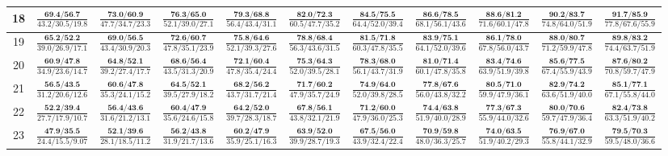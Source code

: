 \documentclass{slides}
\begin{document}
{{{\begin{tabular}{|c|c|c|c|c|c|c|c|c|c|c|}
\hline
18 & $\frac{\textbf{69.4/56.7}}{43.2/30.5/19.8}$ & $\frac{\textbf{73.0/60.9}}{47.7/34.7/23.3}$ & $\frac{\textbf{76.3/65.0}}{52.1/39.0/27.1}$ & $\frac{\textbf{79.3/68.8}}{56.4/43.4/31.1}$ & $\frac{\textbf{82.0/72.3}}{60.5/47.7/35.2}$ & $\frac{\textbf{84.5/75.5}}{64.4/52.0/39.4}$ & $\frac{\textbf{86.6/78.5}}{68.1/56.1/43.6}$ & $\frac{\textbf{88.6/81.2}}{71.6/60.1/47.8}$ & $\frac{\textbf{90.2/83.7}}{74.8/64.0/51.9}$ & $\frac{\textbf{91.7/85.9}}{77.8/67.6/55.9}$ \\
\hline
19 & $\frac{\textbf{65.2/52.2}}{39.0/26.9/17.1}$ & $\frac{\textbf{69.0/56.5}}{43.4/30.9/20.3}$ & $\frac{\textbf{72.6/60.7}}{47.8/35.1/23.9}$ & $\frac{\textbf{75.8/64.6}}{52.1/39.3/27.6}$ & $\frac{\textbf{78.8/68.4}}{56.3/43.6/31.5}$ & $\frac{\textbf{81.5/71.8}}{60.3/47.8/35.5}$ & $\frac{\textbf{83.9/75.1}}{64.1/52.0/39.6}$ & $\frac{\textbf{86.1/78.0}}{67.8/56.0/43.7}$ & $\frac{\textbf{88.0/80.7}}{71.2/59.9/47.8}$ & $\frac{\textbf{89.8/83.2}}{74.4/63.7/51.9}$ \\
\hline
20 & $\frac{\textbf{60.9/47.8}}{34.9/23.6/14.7}$ & $\frac{\textbf{64.8/52.1}}{39.2/27.4/17.7}$ & $\frac{\textbf{68.6/56.4}}{43.5/31.3/20.9}$ & $\frac{\textbf{72.1/60.4}}{47.8/35.4/24.4}$ & $\frac{\textbf{75.3/64.3}}{52.0/39.5/28.1}$ & $\frac{\textbf{78.3/68.0}}{56.1/43.7/31.9}$ & $\frac{\textbf{81.0/71.4}}{60.1/47.8/35.8}$ & $\frac{\textbf{83.4/74.6}}{63.9/51.9/39.8}$ & $\frac{\textbf{85.6/77.5}}{67.4/55.9/43.9}$ & $\frac{\textbf{87.6/80.2}}{70.8/59.7/47.9}$ \\
\hline
21 & $\frac{\textbf{56.5/43.5}}{31.2/20.6/12.6}$ & $\frac{\textbf{60.6/47.8}}{35.3/24.1/15.2}$ & $\frac{\textbf{64.5/52.1}}{39.5/27.9/18.2}$ & $\frac{\textbf{68.2/56.2}}{43.7/31.7/21.4}$ & $\frac{\textbf{71.7/60.2}}{47.9/35.7/24.9}$ & $\frac{\textbf{74.9/64.0}}{52.0/39.8/28.5}$ & $\frac{\textbf{77.8/67.6}}{56.0/43.8/32.2}$ & $\frac{\textbf{80.5/71.0}}{59.9/47.9/36.1}$ & $\frac{\textbf{82.9/74.2}}{63.6/51.9/40.0}$ & $\frac{\textbf{85.1/77.1}}{67.1/55.8/44.0}$ \\
\hline
22 & $\frac{\textbf{52.2/39.4}}{27.7/17.9/10.7}$ & $\frac{\textbf{56.4/43.6}}{31.6/21.2/13.1}$ & $\frac{\textbf{60.4/47.9}}{35.6/24.6/15.8}$ & $\frac{\textbf{64.2/52.0}}{39.7/28.3/18.7}$ & $\frac{\textbf{67.8/56.1}}{43.8/32.1/21.9}$ & $\frac{\textbf{71.2/60.0}}{47.9/36.0/25.3}$ & $\frac{\textbf{74.4/63.8}}{51.9/40.0/28.9}$ & $\frac{\textbf{77.3/67.3}}{55.9/44.0/32.6}$ & $\frac{\textbf{80.0/70.6}}{59.7/47.9/36.4}$ & $\frac{\textbf{82.4/73.8}}{63.3/51.9/40.2}$ \\
\hline
23 & $\frac{\textbf{47.9/35.5}}{24.4/15.5/9.07}$ & $\frac{\textbf{52.1/39.6}}{28.1/18.5/11.2}$ & $\frac{\textbf{56.2/43.8}}{31.9/21.7/13.6}$ & $\frac{\textbf{60.2/47.9}}{35.9/25.1/16.3}$ & $\frac{\textbf{63.9/52.0}}{39.9/28.7/19.3}$ & $\frac{\textbf{67.5/56.0}}{43.9/32.4/22.4}$ & $\frac{\textbf{70.9/59.8}}{48.0/36.3/25.7}$ & $\frac{\textbf{74.0/63.5}}{51.9/40.2/29.3}$ & $\frac{\textbf{76.9/67.0}}{55.8/44.1/32.9}$ & $\frac{\textbf{79.5/70.3}}{59.5/48.0/36.6}$ \\

\end{tabular}}}}
\end{document}
